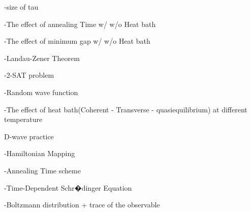 \documentclass[twoside,a4paper,article]{combine}
\begin{document}
-size of tau

-The effect of annealing Time w/ w/o Heat bath

-The effect of minimum gap w/ w/o Heat bath

-Landau-Zener Theorem

-2-SAT problem 

-Random wave function  

-The effect of heat bath(Coherent - Transverse - quasiequilibrium) at different temperature

D-wave practice

-Hamiltonian Mapping

-Annealing Time scheme

-Time-Dependent Schr�dinger Equation

-Boltzmann distribution + trace of the observable






\end{document}
